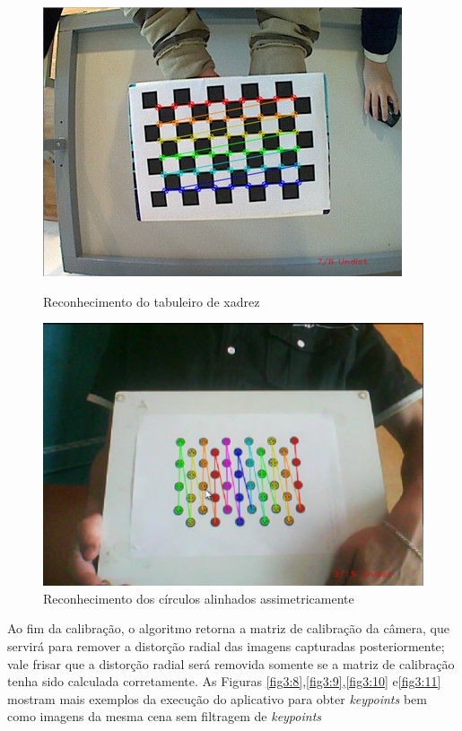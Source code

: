\begin{figure}[H]
  \includegraphics[width=\linewidth]{Imagens/figura3-6.jpg}
  \caption{Reconhecimento do tabuleiro de xadrez}\label{fig3:6}
\endminipage\hfill
{}
  \includegraphics[width=\linewidth]{Imagens/figura3-7.jpg}
  \caption{Reconhecimento dos círculos alinhados assimetricamente}\label{fig3:7}
\endminipage
\end{figure}

Ao fim da calibração, o algoritmo retorna a matriz de calibração da câmera, que servirá para remover a distorção radial das imagens capturadas posteriormente; vale frisar que a distorção radial será removida somente se  a matriz de calibração tenha sido calculada corretamente. As Figuras \ref{fig3:8},\ref{fig3:9},\ref{fig3:10} e\ref{fig3:11} mostram mais exemplos da execução do aplicativo para obter \textit{keypoints} bem como imagens da mesma cena sem filtragem de \textit{keypoints}


